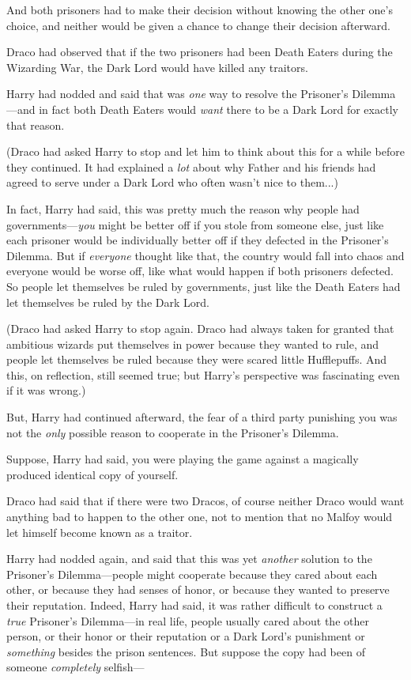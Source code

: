 And both prisoners had to make their decision without knowing the other one’s choice, and neither would be given a chance to change their decision afterward.

Draco had observed that if the two prisoners had been Death Eaters during the Wizarding War, the Dark Lord would have killed any traitors.

Harry had nodded and said that was \emph{one} way to resolve the Prisoner’s Dilemma—and in fact both Death Eaters would \emph{want} there to be a Dark Lord for exactly that reason.

(Draco had asked Harry to stop and let him to think about this for a while before they continued. It had explained a \emph{lot} about why Father and his friends had agreed to serve under a Dark Lord who often wasn’t nice to them...)

In fact, Harry had said, this was pretty much the reason why people had governments—\emph{you} might be better off if you stole from someone else, just like each prisoner would be individually better off if they defected in the Prisoner’s Dilemma. But if \emph{everyone} thought like that, the country would fall into chaos and everyone would be worse off, like what would happen if both prisoners defected. So people let themselves be ruled by governments, just like the Death Eaters had let themselves be ruled by the Dark Lord.

(Draco had asked Harry to stop again. Draco had always taken for granted that ambitious wizards put themselves in power because they wanted to rule, and people let themselves be ruled because they were scared little Hufflepuffs. And this, on reflection, still seemed true; but Harry’s perspective was fascinating even if it was wrong.)

But, Harry had continued afterward, the fear of a third party punishing you was not the \emph{only} possible reason to cooperate in the Prisoner’s Dilemma.

Suppose, Harry had said, you were playing the game against a magically produced identical copy of yourself.

Draco had said that if there were two Dracos, of course neither Draco would want anything bad to happen to the other one, not to mention that no Malfoy would let himself become known as a traitor.

Harry had nodded again, and said that this was yet \emph{another} solution to the Prisoner’s Dilemma—people might cooperate because they cared about each other, or because they had senses of honor, or because they wanted to preserve their reputation. Indeed, Harry had said, it was rather difficult to construct a \emph{true} Prisoner’s Dilemma—in real life, people usually cared about the other person, or their honor or their reputation or a Dark Lord’s punishment or \emph{something} besides the prison sentences. But suppose the copy had been of someone \emph{completely} selfish—

